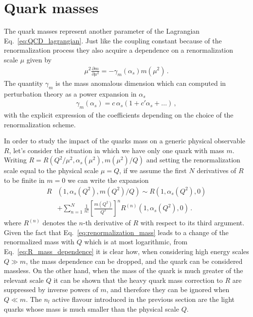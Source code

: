 \section{Quark masses}
\label{sec:quark_masses}
The quark masses represent another parameter of the Lagrangian Eq.~\eqref{eq:QCD_lagrangian}.
Just like the coupling constant because of the renormalization process they also acquire a
dependence on a renormalization scale $\mu$ given by 
\begin{align}
    \label{eq:renormalization_mass}
    \mu^2\frac{\partial m }{\partial \mu^2} = - \gamma_m\left(\alpha_s\right)m\left(\mu^2\right)\,.
\end{align}
The quantity $\gamma_m$ is the mass anomalous dimension which can computed in perturbation theory as
a power expansion in $\alpha_s$
\begin{align}
    \gamma_m\left(\alpha_s\right) = c\,\alpha_s\left(1+c'\alpha_s + ...\right)\,,
\end{align}
with the explicit expression of the coefficients depending on the choice of the renormalization scheme.

%
In order to study the impact of the quarks mass on a generic physical observable $R$, let's consider
the situation in which we have only one quark with mass $m$.
Writing $R = R\left(Q^2/\mu^2, \alpha_s\left(\mu^2\right),m\left(\mu^2\right)/Q \right)$ 
and setting the renormalization scale equal to the physical scale $\mu=Q$,
if we assume the first $N$ derivatives of $R$ to be finite in $m=0$ 
we can write the expansion
\begin{align}
    \label{eq:R_mass_dependence}
    R&\left(1, \alpha_s\left(Q^2\right),m\left(Q^2\right)/Q \right) \sim
    R\left(1, \alpha_s\left(Q^2\right),0 \right)\nonumber \\
    & + \sum_{n=1}^{N}\frac{1}{n!}\left[\frac{m\left(Q^2\right)}{Q^2}\right]^n R^{(n)}\left(1,\alpha_s\left(Q^2\right),0\right)\,.
\end{align}
where $R^{(n)}$ denotes the $n$-th derivative of $R$ with respect to its third argument. 
Given the fact that Eq.~\eqref{eq:renormalization_mass} leads to a change of the renormalized mass with $Q$ 
which is at most logarithmic, from Eq.~\eqref{eq:R_mass_dependence} it is clear how, when considering 
high energy scales $Q \gg m$, the mass dependence can be dropped, and the quark can be considered massless.
%
On the other hand, when the mass of the quark is much greater of the relevant scale $Q$ it can be shown 
that the heavy quark mass correction to $R$ are suppressed by inverse powers of $m$, and therefore they can be ignored when
$Q \ll m$. 
%
The $n_l$ active flavour introduced in the previous section are the light quarks whose mass is much smaller than
the physical scale $Q$.

